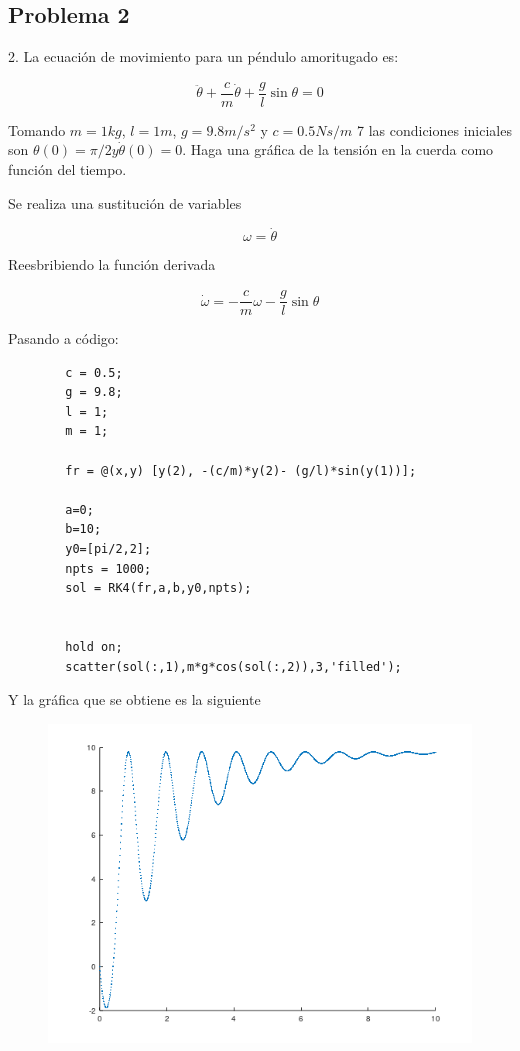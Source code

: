 \documentclass[a4paper, 12pt]{article}
\begin{document}
    \subsection{Problema 2}

    2. La ecuación de movimiento para un péndulo amoritugado es:

    \[
        \ddot{\theta} + \frac{c}{m} \dot{\theta} + \frac{g}{l} \sin \theta = 0  
    \]

    Tomando $m=1 kg$, $l=1m$, $g=9.8m/s^2$ y $c=0.5 Ns/m$ 7 las condiciones iniciales son $\theta(0) = \pi/2 y \dot{\theta}(0) = 0$. Haga una gráfica de la tensión en la cuerda como función del tiempo.

    Se realiza una sustitución de variables

    \[
        \omega = \dot{\theta}
    \]

    Reesbribiendo la función derivada

    \[
        \dot{\omega} = -\frac{c}{m}\omega - \frac{g}{l} \sin \theta
    \]

    Pasando a código:

    \begin{verbatim}
        c = 0.5;
        g = 9.8;
        l = 1;
        m = 1;

        fr = @(x,y) [y(2), -(c/m)*y(2)- (g/l)*sin(y(1))];

        a=0;
        b=10;
        y0=[pi/2,2];
        npts = 1000;
        sol = RK4(fr,a,b,y0,npts);


        hold on;
        scatter(sol(:,1),m*g*cos(sol(:,2)),3,'filled');
    \end{verbatim}

    Y la gráfica que se obtiene es la siguiente

    \begin{figure}[ht!]
        \centering
        \includegraphics[width=16cm]{img/e2.png}
    \end{figure}
\end{document}

